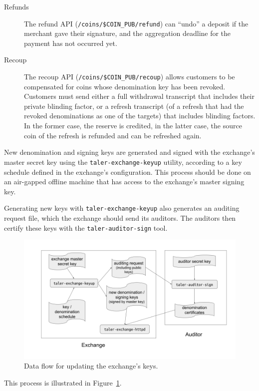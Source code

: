 \begin{description}
  \item[Refunds] The refund API (\texttt{/coins/\$COIN\_PUB/refund}) can ``undo'' a deposit if the merchant gave their signature, and the aggregation deadline
    for the payment has not occurred yet.
  \item[Recoup]  The recoup API (\texttt{/coins/\$COIN\_PUB/recoup}) allows customers to be compensated
    for coins whose denomination key has been revoked.  Customers must send either a full withdrawal transcript that
    includes their private blinding factor, or a refresh transcript (of a refresh that had the revoked denominations as one of the targets)
    that includes blinding factors.  In the former case, the reserve is credited, in the latter case, the source coin of the
    refresh is refunded and can be refreshed again.
\end{description}

New denomination and signing keys are generated and signed with the exchange's master
secret key using the \texttt{taler-exchange-keyup} utility, according to a key schedule
defined in the exchange's configuration.  This process should be done on an air-gapped
offline machine that has access to the exchange's master signing key.

Generating new keys with \texttt{taler-exchange-keyup} also generates an
auditing request file, which the exchange should send its auditors.  The auditors then
certify these keys with the \texttt{taler-auditor-sign} tool.

\begin{figure}
    \includegraphics[width=\textwidth]{diagrams/taler-diagram-keyup.png}
    \caption{Data flow for updating the exchange's keys.}
    \label{figure:keyup}
\end{figure}

This process is illustrated in Figure~\ref{figure:keyup}.


